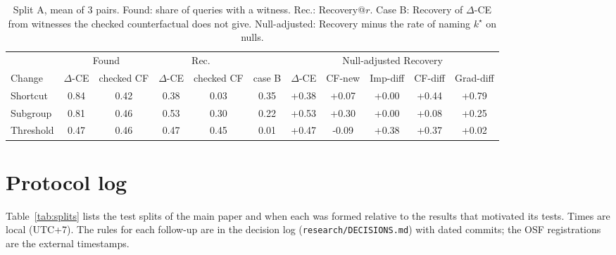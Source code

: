 \documentclass[10pt,a4paper]{article}
\theoremstyle{remark}
\newcommand{\DCE}{$\Delta$-CE}
\begin{document}
\begin{table}[h]
\centering\scriptsize
\setlength{\tabcolsep}{3pt}
\caption{Split A, mean of 3 pairs. Found: share of queries with a witness. Rec.: Recovery@$r$. Case B: Recovery of \DCE{} from witnesses the checked counterfactual does not give. Null-adjusted: Recovery minus the rate of naming $k^\star$ on nulls.}\label{tab:cfcheck}
\begin{tabular}{lcccccccccc}
\toprule
& \multicolumn{2}{c}{Found} & \multicolumn{2}{c}{Rec.} & & \multicolumn{5}{c}{Null-adjusted Recovery}\\
Change & \DCE & checked CF & \DCE & checked CF & case B & \DCE & CF-new & Imp-diff & CF-diff & Grad-diff\\
\midrule
Shortcut & 0.84 & 0.42 & 0.38 & 0.03 & 0.35 & +0.38 & +0.07 & +0.00 & +0.44 & +0.79\\
Subgroup & 0.81 & 0.46 & 0.53 & 0.30 & 0.22 & +0.53 & +0.30 & +0.00 & +0.08 & +0.25\\
Threshold & 0.47 & 0.46 & 0.47 & 0.45 & 0.01 & +0.47 & -0.09 & +0.38 & +0.37 & +0.02\\
\bottomrule
\end{tabular}
\end{table}

\section{Protocol log}\label{sec:log}

Table~\ref{tab:splits} lists the test splits of the main paper and when each was formed relative to the results that motivated its tests. Times are local (UTC+7). The rules for each follow-up are in the decision log (\texttt{research/DECISIONS.md}) with dated commits; the OSF registrations are the external timestamps.
\end{document}
